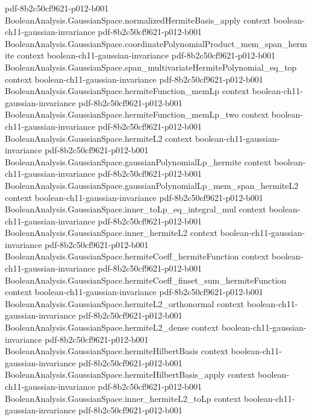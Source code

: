 \begin{theorem}
  {pdf-8b2c50cf9621-p012-b001}
\proofstep
  {BooleanAnalysis.GaussianSpace.normalizedHermiteBasis_apply}
  {context}
  {boolean-ch11-gaussian-invariance}
  {pdf-8b2c50cf9621-p012-b001}
\proofstep
  {BooleanAnalysis.GaussianSpace.coordinatePolynomialProduct_mem_span_hermite}
  {context}
  {boolean-ch11-gaussian-invariance}
  {pdf-8b2c50cf9621-p012-b001}
\proofstep
  {BooleanAnalysis.GaussianSpace.span_multivariateHermitePolynomial_eq_top}
  {context}
  {boolean-ch11-gaussian-invariance}
  {pdf-8b2c50cf9621-p012-b001}
\proofstep
  {BooleanAnalysis.GaussianSpace.hermiteFunction_memLp}
  {context}
  {boolean-ch11-gaussian-invariance}
  {pdf-8b2c50cf9621-p012-b001}
\proofstep
  {BooleanAnalysis.GaussianSpace.hermiteFunction_memLp_two}
  {context}
  {boolean-ch11-gaussian-invariance}
  {pdf-8b2c50cf9621-p012-b001}
\proofstep
  {BooleanAnalysis.GaussianSpace.hermiteL2}
  {context}
  {boolean-ch11-gaussian-invariance}
  {pdf-8b2c50cf9621-p012-b001}
\proofstep
  {BooleanAnalysis.GaussianSpace.gaussianPolynomialLp_hermite}
  {context}
  {boolean-ch11-gaussian-invariance}
  {pdf-8b2c50cf9621-p012-b001}
\proofstep
  {BooleanAnalysis.GaussianSpace.gaussianPolynomialLp_mem_span_hermiteL2}
  {context}
  {boolean-ch11-gaussian-invariance}
  {pdf-8b2c50cf9621-p012-b001}
\proofstep
  {BooleanAnalysis.GaussianSpace.inner_toLp_eq_integral_mul}
  {context}
  {boolean-ch11-gaussian-invariance}
  {pdf-8b2c50cf9621-p012-b001}
\proofstep
  {BooleanAnalysis.GaussianSpace.inner_hermiteL2}
  {context}
  {boolean-ch11-gaussian-invariance}
  {pdf-8b2c50cf9621-p012-b001}
\proofstep
  {BooleanAnalysis.GaussianSpace.hermiteCoeff_hermiteFunction}
  {context}
  {boolean-ch11-gaussian-invariance}
  {pdf-8b2c50cf9621-p012-b001}
\proofstep
  {BooleanAnalysis.GaussianSpace.hermiteCoeff_finset_sum_hermiteFunction}
  {context}
  {boolean-ch11-gaussian-invariance}
  {pdf-8b2c50cf9621-p012-b001}
\proofstep
  {BooleanAnalysis.GaussianSpace.hermiteL2_orthonormal}
  {context}
  {boolean-ch11-gaussian-invariance}
  {pdf-8b2c50cf9621-p012-b001}
\proofstep
  {BooleanAnalysis.GaussianSpace.hermiteL2_dense}
  {context}
  {boolean-ch11-gaussian-invariance}
  {pdf-8b2c50cf9621-p012-b001}
\proofstep
  {BooleanAnalysis.GaussianSpace.hermiteHilbertBasis}
  {context}
  {boolean-ch11-gaussian-invariance}
  {pdf-8b2c50cf9621-p012-b001}
\proofstep
  {BooleanAnalysis.GaussianSpace.hermiteHilbertBasis_apply}
  {context}
  {boolean-ch11-gaussian-invariance}
  {pdf-8b2c50cf9621-p012-b001}
\proofstep
  {BooleanAnalysis.GaussianSpace.inner_hermiteL2_toLp}
  {context}
  {boolean-ch11-gaussian-invariance}
  {pdf-8b2c50cf9621-p012-b001}

\end{theorem}
